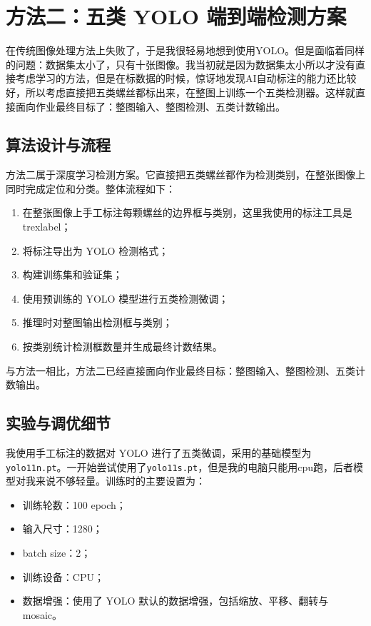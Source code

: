 \documentclass[12pt,a4paper]{ctexart}
\begin{document}
\section{方法二：五类 YOLO 端到端检测方案}
在传统图像处理方法上失败了，于是我很轻易地想到使用YOLO。但是面临着同样的问题：数据集太小了，只有十张图像。我当初就是因为数据集太小所以才没有直接考虑学习的方法，但是在标数据的时候，惊讶地发现AI自动标注的能力还比较好，所以考虑直接把五类螺丝都标出来，在整图上训练一个五类检测器。这样就直接面向作业最终目标了：整图输入、整图检测、五类计数输出。

\subsection{算法设计与流程}

方法二属于深度学习检测方案。它直接把五类螺丝都作为检测类别，在整张图像上同时完成定位和分类。整体流程如下：
\begin{enumerate}
    \item 在整张图像上手工标注每颗螺丝的边界框与类别，这里我使用的标注工具是trexlabel；
    \item 将标注导出为 YOLO 检测格式；
    \item 构建训练集和验证集；
    \item 使用预训练的 YOLO 模型进行五类检测微调；
    \item 推理时对整图输出检测框与类别；
    \item 按类别统计检测框数量并生成最终计数结果。
\end{enumerate}

与方法一相比，方法二已经直接面向作业最终目标：整图输入、整图检测、五类计数输出。

\subsection{实验与调优细节}

我使用手工标注的数据对 YOLO 进行了五类微调，采用的基础模型为 \texttt{yolo11n.pt}。一开始尝试使用了\texttt{yolo11s.pt}，但是我的电脑只能用cpu跑，后者模型对我来说不够轻量。训练时的主要设置为：
\begin{itemize}
    \item 训练轮数：100 epoch；
    \item 输入尺寸：1280；
    \item batch size：2；
    \item 训练设备：CPU；
    \item 数据增强：使用了 YOLO 默认的数据增强，包括缩放、平移、翻转与 mosaic。
\end{itemize}
\end{document}
